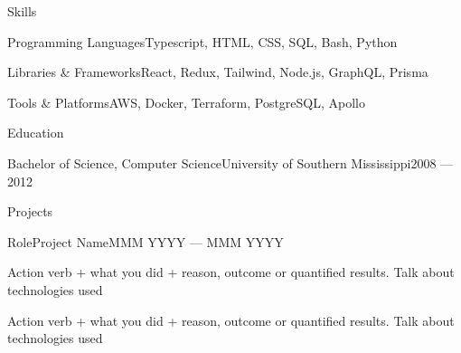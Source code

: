 \documentclass{resume} %
\begin{document}
  \begin{rSection}{Skills}
      \begin{rSkillItem}{Programming Languages}{Typescript, HTML, CSS, SQL, Bash, Python}
      \end{rSkillItem}
      \begin{rSkillItem}{Libraries \& Frameworks}{React, Redux, Tailwind, Node.js, GraphQL, Prisma}
      \end{rSkillItem}
      \begin{rSkillItem}{Tools \& Platforms}{AWS, Docker, Terraform, PostgreSQL, Apollo}
      \end{rSkillItem}
    \vspace{0.25em}
  \end{rSection}



  \begin{rSection}{Education}

      \begin{rEducationItem}{Bachelor of Science, Computer Science}{University of Southern Mississippi}{2008 --- 2012}
      \end{rEducationItem}

  \end{rSection}


  \begin{rSection}{Projects}

      \begin{rWorkHistoryItem}{Role}{Project Name}{MMM YYYY --- MMM YYYY}
          \item Action verb + what you did + reason, outcome or quantified results. Talk about technologies used
          \item Action verb + what you did + reason, outcome or quantified results. Talk about technologies used
      \end{rWorkHistoryItem}

  \end{rSection}

\end{document}

